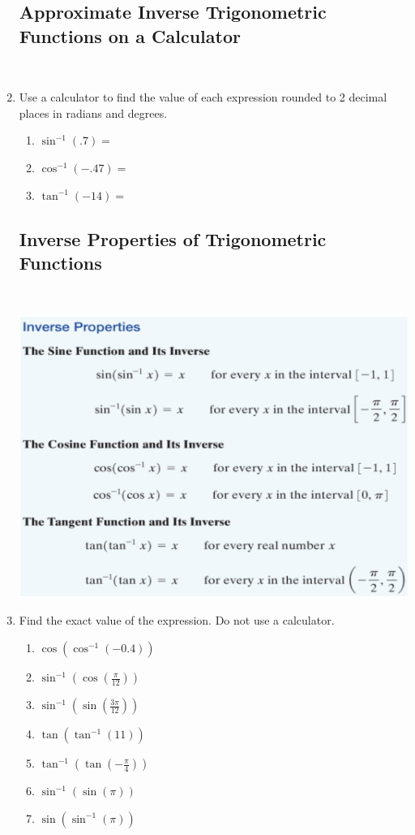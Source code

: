 \begin{enumerate}
\begin{enumerate}
\end{enumerate}


\subsection{Approximate Inverse Trigonometric Functions on a Calculator} ~

\item Use a calculator to find the value of each expression rounded to 2 decimal places in radians and degrees.
\begin{enumerate}
\item $\sin^{-1}(.7)=$\\
\item $\cos^{-1}(-.47)=$\\
\item $\tan^{-1}(-14)=$\\
\end{enumerate}


\newpage

\subsection{Inverse Properties of Trigonometric Functions} ~

\includegraphics[scale=.7]{inverseprops}

\item Find the exact value of the expression.  Do not use a calculator.
\begin{enumerate}
\item $\displaystyle \cos(\cos^{-1}(-0.4))$\vfill
\item  $\displaystyle \sin^{-1}(\cos(\frac{\pi}{12}))$\vfill
\item $\displaystyle \sin^{-1}(\sin(\frac{3\pi}{12}))$\vfill
\newpage
\item $\displaystyle \tan(\tan^{-1}(11))$\vfill
\item  $\displaystyle \tan^{-1}(\tan(-\frac{\pi}{4}))$\vfill
\item  $\displaystyle \sin^{-1}(\sin(\pi))$\vfill
\item $\displaystyle \sin(\sin^{-1}(\pi))$\vfill
\end{enumerate}


\end{enumerate}
